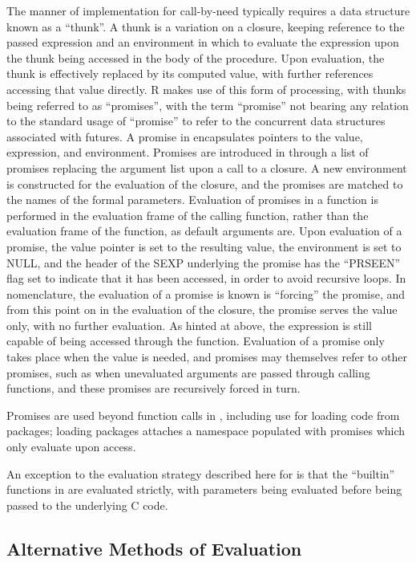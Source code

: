 The manner of implementation for call-by-need typically requires a data structure known as a ``thunk''\cite{ingerman1961thunks}.
A thunk is a variation on a closure, keeping reference to the passed expression and an environment in which to evaluate the expression upon the thunk being accessed in the body of the procedure.
Upon evaluation, the thunk is effectively replaced by its computed value, with further references accessing that value directly.
R makes use of this form of processing, with thunks being referred to as ``promises'', with the term ``promise'' not bearing any relation to the standard usage of ``promise'' to refer to the concurrent data structures associated with futures\cite{rcore2020lang:promise}.
A promise in \R encapsulates pointers to the value, expression, and environment.
Promises are introduced in \R through a list of promises replacing the argument list upon a call to a closure.
A new environment is constructed for the evaluation of the closure, and the promises are matched to the names of the formal parameters.
Evaluation of promises in a function is performed in the evaluation frame of the calling function, rather than the evaluation frame of the function, as default arguments are.
Upon evaluation of a promise, the value pointer is set to the resulting value, the environment is set to NULL, and the header of the SEXP underlying the promise has the ``PRSEEN'' flag set to indicate that it has been accessed, in order to avoid recursive loops.
In \R nomenclature, the evaluation of a promise is known is ``forcing'' the promise, and from this point on in the evaluation of the closure, the promise serves the value only, with no further evaluation.
As hinted at above, the expression is still capable of being accessed through the  function.
Evaluation of a promise only takes place when the value is needed, and promises may themselves refer to other promises, such as when unevaluated arguments are passed through calling functions, and these promises are recursively forced in turn.

Promises are used beyond function calls in \R, including use for loading code from packages; loading packages attaches a namespace populated with promises which only evaluate upon access.

An exception to the evaluation strategy described here for \R is that the ``builtin'' functions in \R are evaluated strictly, with parameters being evaluated before being passed to the underlying C code.

\subsection{Alternative Methods of Evaluation}

